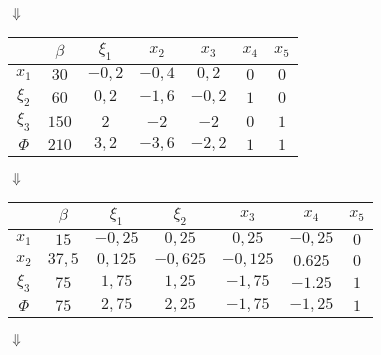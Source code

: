 \documentclass{article}
\begin{document}
\begin{enumerate}
\begin{center}
    $\Downarrow$

    \begin{tabular}{ c | c | c | c | c | c | c}
        & $\beta$ & $\xi_1$ & $x_2$ & $x_3$ & $x_4$ & $x_5$\\
        \hline
        $x_1$ & $30$ & $-0{,}2$ & $-0{,}4$ & $0{,}2$  & $0$ & $0$ \\
        $\xi_2$ & $60$ & $0{,}2$ & $\boxed{-1{,}6}$ & $-0{,}2$ & $1$ & $0$ \\
        $\xi_3$ & $150$ & $2$ & $-2$ & $-2$ & $0$ & $1$ \\
        \hline
        $\Phi$   & $210$ & $3{,}2$ & $-3{,}6$ & $-2{,}2$ & $1$ & $1$ \\
    \end{tabular}

    $\Downarrow$

    \begin{tabular}{ c | c | c | c | c | c | c}
        & $\beta$ & $\xi_1$ & $\xi_2$ & $x_3$ & $x_4$ & $x_5$\\
        \hline
        $x_1$   & $15$ & $-0{,}25$ & $0{,}25$ & $0{,}25$ & $-0{,}25$ & $0$ \\
        $x_2$ & $37{,}5$ & $0{,}125$ & $-0{,}625$ & $-0{,}125$ & $0.625$ & $0$ \\
        $\xi_3$ & $75$ & $1{,}75$ & $1{,}25$ & $\boxed{-1{,}75}$ & $-1.25$ & $1$ \\
        \hline
        $\Phi$   & $75$ & $2{,}75$ & $2{,}25$ & $-1{,}75$ & $-1{,}25$ & $1$ \\
    \end{tabular}

    $\Downarrow$


\end{center}
\end{enumerate}
\end{document}
